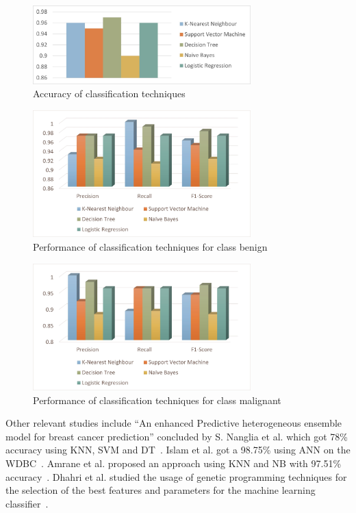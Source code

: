 \begin{figure}[h!]
    \centering
    \includegraphics[width=0.75\textwidth]{figures/Figure1.jpg}
    \caption{Accuracy of classification techniques}
    \label{fig:fig1}
\end{figure}
\begin{figure}[h!]
    \centering
    \includegraphics[width=0.75\textwidth]{figures/Figure2.jpg}
    \caption{Performance of classification techniques for class benign}
    \label{fig:fig2}
\end{figure}
\begin{figure}[h!]
    \centering
    \includegraphics[width=0.75\textwidth]{figures/Figure3.jpg}
    \caption{Performance of classification techniques for class malignant}
    \label{fig:fig3}
\end{figure}

Other relevant studies include “An enhanced Predictive heterogeneous ensemble model for breast cancer prediction” concluded by S. Nanglia et al. which got 78\% accuracy using KNN, SVM and DT~\cite{carte1}. Islam et al. got a 98.75\% using ANN on the WDBC~\cite{carte3}. Amrane et al. proposed an approach using KNN and NB with 97.51\% accuracy~\cite{carte4}. Dhahri et al. studied the usage of genetic programming techniques for the selection of the best features and parameters for the machine learning classifier~\cite{carte5}.